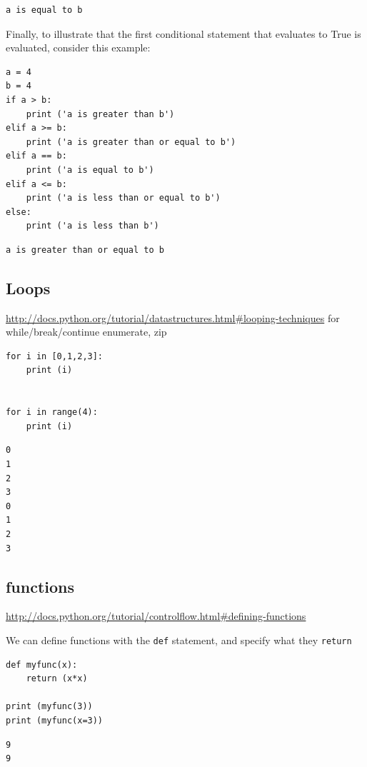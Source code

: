 \documentclass[11pt]{article}
\begin{document}
\begin{verbatim}
a is equal to b
\end{verbatim}

Finally, to illustrate that the first conditional statement that evaluates to True is evaluated, consider this example:
\begin{verbatim}
a = 4
b = 4
if a > b:
    print ('a is greater than b')
elif a >= b:
    print ('a is greater than or equal to b')
elif a == b:
    print ('a is equal to b')
elif a <= b:
    print ('a is less than or equal to b')
else:
    print ('a is less than b')
\end{verbatim}

\begin{verbatim}
a is greater than or equal to b
\end{verbatim}


\subsection{Loops}
\label{sec:org16ea1e4}
\url{http://docs.python.org/tutorial/datastructures.html\#looping-techniques}
for
while/break/continue
enumerate, zip

\begin{verbatim}
for i in [0,1,2,3]:
    print (i)


for i in range(4):
    print (i)
\end{verbatim}

\begin{verbatim}
0
1
2
3
0
1
2
3
\end{verbatim}


\subsection{functions}
\label{sec:org35c7809}
\url{http://docs.python.org/tutorial/controlflow.html\#defining-functions}

We can define functions with the \texttt{def} statement, and specify what they \texttt{return}
\begin{verbatim}
def myfunc(x):
    return (x*x)

print (myfunc(3))
print (myfunc(x=3))
\end{verbatim}

\begin{verbatim}
9
9
\end{verbatim}
\end{document}
